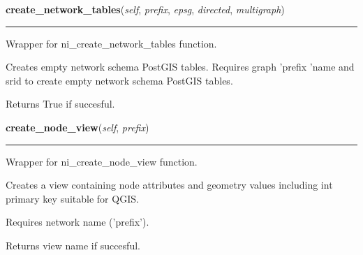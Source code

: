     \label{nx_pgnet:nisql:create_network_tables}

    \vspace{0.5ex}

\hspace{.8\funcindent}\begin{boxedminipage}{\funcwidth}

    \raggedright \textbf{create\_network\_tables}(\textit{self}, \textit{prefix}, \textit{epsg}, \textit{directed}, \textit{multigraph})

    \vspace{-1.5ex}

    \rule{\textwidth}{0.5\fboxrule}
\setlength{\parskip}{2ex}
    Wrapper for ni\_create\_network\_tables function.

    Creates empty network schema PostGIS tables. Requires graph 'prefix 
    'name and srid to create empty network schema PostGIS tables.

    Returns True if succesful.

\setlength{\parskip}{1ex}
    \end{boxedminipage}

    \label{nx_pgnet:nisql:create_node_view}

    \vspace{0.5ex}

\hspace{.8\funcindent}\begin{boxedminipage}{\funcwidth}

    \raggedright \textbf{create\_node\_view}(\textit{self}, \textit{prefix})

    \vspace{-1.5ex}

    \rule{\textwidth}{0.5\fboxrule}
\setlength{\parskip}{2ex}
    Wrapper for ni\_create\_node\_view function.

    Creates a view containing node attributes and geometry values including
    int primary key suitable for QGIS.

    Requires network name ('prefix').

    Returns view name if succesful.

\setlength{\parskip}{1ex}
    \end{boxedminipage}

